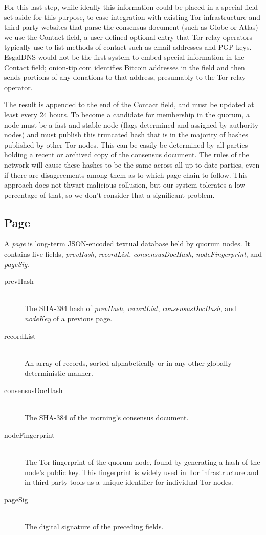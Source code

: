 For this last step, while ideally this information could be placed in a special field set aside for this purpose, to ease integration with existing Tor infrastructure and third-party websites that parse the consensus document (such as Globe or Atlas) we use the Contact field, a user-defined optional entry that Tor relay operators typically use to list methods of contact such as email addresses and PGP keys. EsgalDNS would not be the first system to embed special information in the Contact field; onion-tip.com identifies Bitcoin addresses in the field and then sends portions of any donations to that address, presumably to the Tor relay operator.

The result is appended to the end of the Contact field, and must be updated at least every 24 hours. To become a candidate for membership in the quorum, a node must be a fast and stable node (flags determined and assigned by authority nodes) and must publish this truncated hash that is in the majority of hashes published by other Tor nodes. This can be easily be determined by all parties holding a recent or archived copy of the consensus document. The rules of the network will cause these hashes to be the same across all up-to-date parties, even if there are disagreements among them as to which page-chain to follow. This approach does not thwart malicious collusion, but our system tolerates a low percentage of that, so we don't consider that a significant problem.


\subsection{Page}

A \emph{page} is long-term JSON-encoded textual database held by quorum nodes. It contains five fields, \emph{prevHash}, \emph{recordList}, \emph{consensusDocHash}, \emph{nodeFingerprint}, and \emph{pageSig}. 

\begin{description}
	\item[prevHash] \hfill \\
		The SHA-384 hash of \emph{prevHash}, \emph{recordList}, \emph{consensusDocHash}, and \emph{nodeKey} of a previous page.
	\item[recordList] \hfill \\
		An array of records, sorted alphabetically or in any other globally deterministic manner.
	\item[consensusDocHash] \hfill \\
		The SHA-384 of the morning's consensus document.
	\item[nodeFingerprint] \hfill \\
		The Tor fingerprint of the quorum node, found by generating a hash of the node's public key. This fingerprint is widely used in Tor infrastructure and in third-party tools as a unique identifier for individual Tor nodes.
	\item[pageSig] \hfill \\
		The digital signature of the preceding fields.
\end{description}

